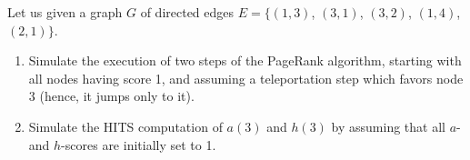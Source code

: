 \exercise

Let us given a graph $G$ of directed edges $E = \{(1, 3)$, $(3, 1)$, $(3, 2)$, $(1, 4)$, $(2,1) \}$.
%
\begin{enumerate}

  \item Simulate the execution of two steps of the PageRank algorithm, starting
  with all nodes having score 1, and assuming a teleportation step which favors
  node 3 (hence, it jumps only to it).

  \item Simulate the HITS computation of $a(3)$ and $h(3)$ by assuming that all
  $a$- and $h$-scores are initially set to 1.

\end{enumerate}

\solution

